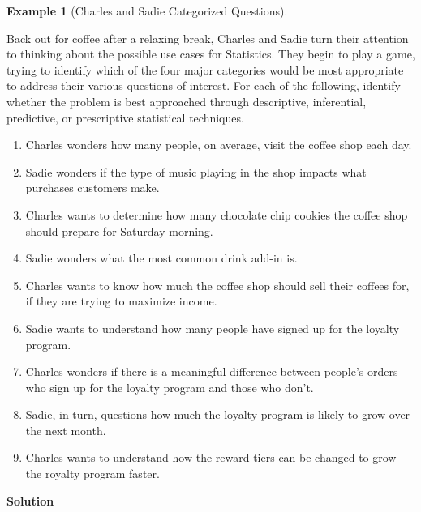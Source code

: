 \documentclass[
  letterpaper,
  DIV=11,
  numbers=noendperiod]{scrreprt}
\providecommand{\tightlist}{%
  \setlength{\itemsep}{0pt}\setlength{\parskip}{0pt}}\usepackage{longtable,booktabs,array}
\theoremstyle{definition}
\theoremstyle{definition}
\newtheorem{example}{Example}[chapter]
\theoremstyle{definition}
\theoremstyle{remark}
\begin{document}
\begin{example}[Charles and Sadie Categorized
Questions]\protect\hypertarget{exm-type-of-statistics}{}\label{exm-type-of-statistics}

Back out for coffee after a relaxing break, Charles and Sadie turn their
attention to thinking about the possible use cases for Statistics. They
begin to play a game, trying to identify which of the four major
categories would be most appropriate to address their various questions
of interest. For each of the following, identify whether the problem is
best approached through descriptive, inferential, predictive, or
prescriptive statistical techniques.

\begin{enumerate}
\def\labelenumi{\alph{enumi}.}
\tightlist
\item
  Charles wonders how many people, on average, visit the coffee shop
  each day.
\item
  Sadie wonders if the type of music playing in the shop impacts what
  purchases customers make.
\item
  Charles wants to determine how many chocolate chip cookies the coffee
  shop should prepare for Saturday morning.
\item
  Sadie wonders what the most common drink add-in is.
\item
  Charles wants to know how much the coffee shop should sell their
  coffees for, if they are trying to maximize income.
\item
  Sadie wants to understand how many people have signed up for the
  loyalty program.
\item
  Charles wonders if there is a meaningful difference between people's
  orders who sign up for the loyalty program and those who don't.
\item
  Sadie, in turn, questions how much the loyalty program is likely to
  grow over the next month.
\item
  Charles wants to understand how the reward tiers can be changed to
  grow the royalty program faster.
\end{enumerate}

\begin{tcolorbox}[enhanced jigsaw, colback=white, colframe=quarto-callout-color-frame, arc=.35mm, leftrule=.75mm, rightrule=.15mm, opacityback=0, breakable, bottomrule=.15mm, left=2mm, toprule=.15mm]

\vspace{-3mm}\textbf{Solution}\vspace{3mm}


\end{tcolorbox}
\end{example}
\end{document}
